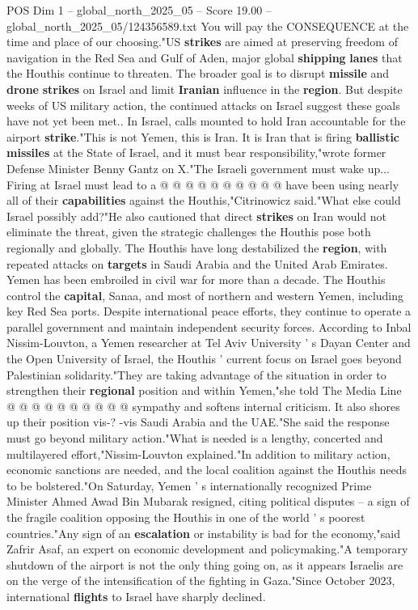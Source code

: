 \begin{textsample}{POS Dim 1 – global\_north\_2025\_05 – Score 19.00 – global\_north\_2025\_05/124356589.txt}
You will pay the CONSEQUENCE at the time and place of our choosing."US \textbf{strikes} are aimed at preserving freedom of navigation in the Red Sea and Gulf of Aden, major global \textbf{shipping} \textbf{lanes} that the Houthis continue to threaten.
The broader goal is to disrupt \textbf{missile} and \textbf{drone} \textbf{strikes} on Israel and limit \textbf{Iranian} influence in the \textbf{region}.
But despite weeks of US military action, the continued attacks on Israel suggest these goals have not yet been met..
In Israel, calls mounted to hold Iran accountable for the airport \textbf{strike}."This is not Yemen, this is Iran.
It is Iran that is firing \textbf{ballistic} \textbf{missiles} at the State of Israel, and it must bear responsibility,"wrote former Defense Minister Benny Gantz on X."The Israeli government must wake up...
Firing at Israel must lead to a @ @ @ @ @ @ @ @ @ @ have been using nearly all of their \textbf{capabilities} against the Houthis,"Citrinowicz said."What else could Israel possibly add?"He also cautioned that direct \textbf{strikes} on Iran would not eliminate the threat, given the strategic challenges the Houthis pose both regionally and globally.
The Houthis have long destabilized the \textbf{region}, with repeated attacks on \textbf{targets} in Saudi Arabia and the United Arab Emirates.
Yemen has been embroiled in civil war for more than a decade.
The Houthis control the \textbf{capital}, Sanaa, and most of northern and western Yemen, including key Red Sea ports.
Despite international peace efforts, they continue to operate a parallel government and maintain independent security forces.
According to Inbal Nissim-Louvton, a Yemen researcher at Tel Aviv University ' s Dayan Center and the Open University of Israel, the Houthis ' current focus on Israel goes beyond Palestinian solidarity."They are taking advantage of the situation in order to strengthen their \textbf{regional} position and within Yemen,"she told The Media Line @ @ @ @ @ @ @ @ @ @ sympathy and softens internal criticism.
It also shores up their position vis-? -vis Saudi Arabia and the UAE."She said the response must go beyond military action."What is needed is a lengthy, concerted and multilayered effort,"Nissim-Louvton explained."In addition to military action, economic sanctions are needed, and the local coalition against the Houthis needs to be bolstered."On Saturday, Yemen ' s internationally recognized Prime Minister Ahmed Awad Bin Mubarak resigned, citing political disputes -- a sign of the fragile coalition opposing the Houthis in one of the world ' s poorest countries."Any sign of an \textbf{escalation} or instability is bad for the economy,"said Zafrir Asaf, an expert on economic development and policymaking."A temporary shutdown of the airport is not the only thing going on, as it appears Israelis are on the verge of the intensification of the fighting in Gaza."Since October 2023, international \textbf{flights} to Israel have sharply declined.

\end{textsample}

